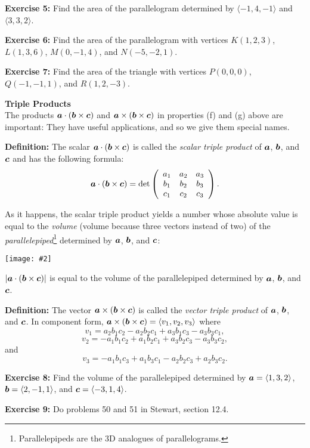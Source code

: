 \documentclass[12pt]{article}
\newcommand{\sectitle}[1]{\vspace{7.5mm}\noindent\textbf{\Large{#1}}\\[3mm]}
\newcommand{\comps}[1]{\langle #1_1,#1_2,#1_3\rangle}
\newcommand{\compslong}[3]{\langle #1, #2, #3\rangle}
\newcommand{\pic}[2]{\begin{center}\texttt{[image: \#2]}\end{center}}
\newcommand{\resultbox}[1]{\begin{center}
		\begin{tcolorbox}[
			enhanced,
			colback=white,
			colframe=black,
			boxrule=0.5pt,
			arc=0pt,
			top=3mm,
			bottom=3mm, 
			width=7in%
			]
			\centering
			#1
		\end{tcolorbox}
\end{center}}
\begin{document}
	\noindent\textbf{Exercise 5:} Find the area of the parallelogram determined by $\compslong{-1}{4}{-1}$ and $\compslong{3}{3}{2}$.\vspace{3mm}
	
	\noindent\textbf{Exercise 6:} Find the area of the parallelogram with vertices $K(1,2,3)$, $L(1,3,6)$, $M(0,-1,4)$, and $N(-5,-2,1)$.\vspace{3mm}
	
	\noindent\textbf{Exercise 7:} Find the area of the triangle with vertices $P(0,0,0)$, $Q(-1,-1,1)$, and $R(1,2,-3)$.
	
	\sectitle{Triple Products}
	The products $\boldsymbol{a}\cdot(\boldsymbol{b}\times\boldsymbol{c})$ and $\boldsymbol{a}\times(\boldsymbol{b}\times\boldsymbol{c})$ in properties (f) and (g) above are important: They have useful applications, and so we give them special names.\vspace{3mm}
	
	\noindent\textbf{Definition:} The scalar $\boldsymbol{a}\cdot(\boldsymbol{b}\times\boldsymbol{c})$ is called the \textit{scalar triple product} of $\boldsymbol{a}$, $\boldsymbol{b}$, and $\boldsymbol{c}$ and has the following formula:
	$$
	\label{eq:scalartriple}
	\boldsymbol{a}\cdot(\boldsymbol{b}\times\boldsymbol{c})=\det\left(\begin{array}{ccc}a_1 & a_2 & a_3\\b_1 & b_2 & b_3\\c_1 & c_2 & c_3\end{array}\right).
	$$\vspace{3mm}
	
	As it happens, the scalar triple product yields a number whose absolute value is equal to the \textit{volume} (volume because three vectors instead of two) of the \textit{parallelepiped}\footnote{Parallelepipeds are the 3D analogues of parallelograms.} determined by $\boldsymbol{a}$, $\boldsymbol{b}$, and $\boldsymbol{c}$:
	
	\pic{0.875}{parallelepiped}
	
	\resultbox{$|\boldsymbol{a}\cdot(\boldsymbol{b}\times\boldsymbol{c})|$ is equal to the volume of the parallelepiped determined by $\boldsymbol{a}$, $\boldsymbol{b}$, and $\boldsymbol{c}$.}
	
	\noindent\textbf{Definition:} The vector $\boldsymbol{a}\times(\boldsymbol{b}\times\boldsymbol{c})$ is called the \textit{vector triple product} of $\boldsymbol{a}$, $\boldsymbol{b}$, and $\boldsymbol{c}$. In component form, $\vect{a}\times(\vect{b}\times\vect{c})=\comps{v}$ where
	$$v_1=a_2 b_1 c_2-a_2 b_2 c_1+a_3 b_1 c_3-a_3 b_3 c_1,$$
	$$v_2=-a_1 b_1 c_2+a_1 b_2 c_1+a_3 b_2 c_3-a_3 b_3 c_2,$$
	and 
	$$v_3=-a_1 b_1 c_3+a_1 b_3 c_1-a_2 b_2 c_3+a_2 b_3 c_2.$$\vspace{3mm}
	
	\noindent\textbf{Exercise 8:} Find the volume of the parallelepiped determined by $\vect{a}=\compslong{1}{3}{2}$, $\vect{b}=\compslong{2}{-1}{1}$, and $\vect{c}=\compslong{-3}{1}{4}$.\vspace{3mm}
	
	\noindent\textbf{Exercise 9:} Do problems 50 and 51 in Stewart, section 12.4.
\end{document}
